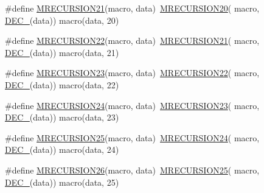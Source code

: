 \begin{DoxyCompactItemize}
\item 
\#define \mbox{\hyperlink{group__group__sam0__utils__mrecursion_ga077fdbda319ee988c77241afa1ff82f9}{M\+R\+E\+C\+U\+R\+S\+I\+O\+N21}}(macro,  data)~\mbox{\hyperlink{group__group__sam0__utils__mrecursion_ga478355d5095a62f243dae4c9de56094c}{M\+R\+E\+C\+U\+R\+S\+I\+O\+N20}}(  macro, \mbox{\hyperlink{group__group__sam0__utils__mrecursion_ga1d23d683797679dca8c3512a54a5dcae}{D\+E\+C\+\_\+}}(data))   macro(data, 20)
\item 
\#define \mbox{\hyperlink{group__group__sam0__utils__mrecursion_gaae9d51e102fe3731e303a6142f0a61c7}{M\+R\+E\+C\+U\+R\+S\+I\+O\+N22}}(macro,  data)~\mbox{\hyperlink{group__group__sam0__utils__mrecursion_ga077fdbda319ee988c77241afa1ff82f9}{M\+R\+E\+C\+U\+R\+S\+I\+O\+N21}}(  macro, \mbox{\hyperlink{group__group__sam0__utils__mrecursion_ga1d23d683797679dca8c3512a54a5dcae}{D\+E\+C\+\_\+}}(data))   macro(data, 21)
\item 
\#define \mbox{\hyperlink{group__group__sam0__utils__mrecursion_gad36f213730d138d54937ecd3944a6062}{M\+R\+E\+C\+U\+R\+S\+I\+O\+N23}}(macro,  data)~\mbox{\hyperlink{group__group__sam0__utils__mrecursion_gaae9d51e102fe3731e303a6142f0a61c7}{M\+R\+E\+C\+U\+R\+S\+I\+O\+N22}}(  macro, \mbox{\hyperlink{group__group__sam0__utils__mrecursion_ga1d23d683797679dca8c3512a54a5dcae}{D\+E\+C\+\_\+}}(data))   macro(data, 22)
\item 
\#define \mbox{\hyperlink{group__group__sam0__utils__mrecursion_ga18b9e365b9471938a0a0dbe70d1edfff}{M\+R\+E\+C\+U\+R\+S\+I\+O\+N24}}(macro,  data)~\mbox{\hyperlink{group__group__sam0__utils__mrecursion_gad36f213730d138d54937ecd3944a6062}{M\+R\+E\+C\+U\+R\+S\+I\+O\+N23}}(  macro, \mbox{\hyperlink{group__group__sam0__utils__mrecursion_ga1d23d683797679dca8c3512a54a5dcae}{D\+E\+C\+\_\+}}(data))   macro(data, 23)
\item 
\#define \mbox{\hyperlink{group__group__sam0__utils__mrecursion_gab0af7dcb16c6cab77aee742dc6b7f14b}{M\+R\+E\+C\+U\+R\+S\+I\+O\+N25}}(macro,  data)~\mbox{\hyperlink{group__group__sam0__utils__mrecursion_ga18b9e365b9471938a0a0dbe70d1edfff}{M\+R\+E\+C\+U\+R\+S\+I\+O\+N24}}(  macro, \mbox{\hyperlink{group__group__sam0__utils__mrecursion_ga1d23d683797679dca8c3512a54a5dcae}{D\+E\+C\+\_\+}}(data))   macro(data, 24)
\item 
\#define \mbox{\hyperlink{group__group__sam0__utils__mrecursion_ga1489cb59fe5eae201d1b3ef286a3a0bf}{M\+R\+E\+C\+U\+R\+S\+I\+O\+N26}}(macro,  data)~\mbox{\hyperlink{group__group__sam0__utils__mrecursion_gab0af7dcb16c6cab77aee742dc6b7f14b}{M\+R\+E\+C\+U\+R\+S\+I\+O\+N25}}(  macro, \mbox{\hyperlink{group__group__sam0__utils__mrecursion_ga1d23d683797679dca8c3512a54a5dcae}{D\+E\+C\+\_\+}}(data))   macro(data, 25)

\end{DoxyCompactItemize}
